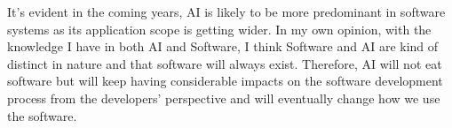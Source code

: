 \documentclass{article}
\begin{document}
It's evident in the coming years, AI is likely to be more predominant in software systems as its application scope is getting wider. In my own opinion, with the knowledge I have in both AI and Software, I think Software and AI are kind of distinct in nature and that software will always exist. Therefore, AI will not eat software but will keep having considerable impacts on the software development process from the developers' perspective and will eventually change how we use the software.
\end{document}
